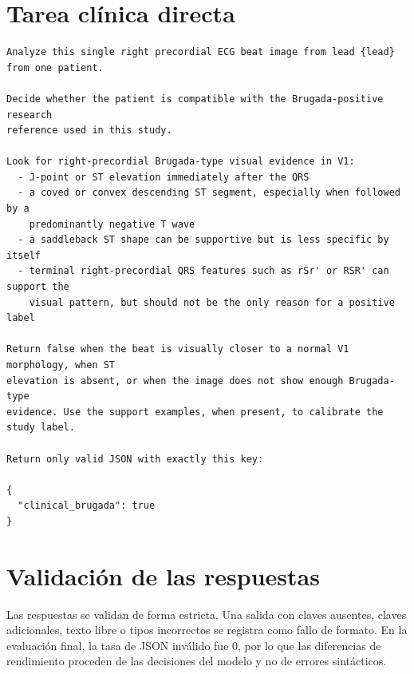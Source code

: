 \section{Tarea cl\'inica directa}

\begin{lstlisting}
Analyze this single right precordial ECG beat image from lead {lead} from one patient.

Decide whether the patient is compatible with the Brugada-positive research
reference used in this study.

Look for right-precordial Brugada-type visual evidence in V1:
  - J-point or ST elevation immediately after the QRS
  - a coved or convex descending ST segment, especially when followed by a
    predominantly negative T wave
  - a saddleback ST shape can be supportive but is less specific by itself
  - terminal right-precordial QRS features such as rSr' or RSR' can support the
    visual pattern, but should not be the only reason for a positive label

Return false when the beat is visually closer to a normal V1 morphology, when ST
elevation is absent, or when the image does not show enough Brugada-type
evidence. Use the support examples, when present, to calibrate the study label.

Return only valid JSON with exactly this key:

{
  "clinical_brugada": true
}
\end{lstlisting}

\section{Validaci\'on de las respuestas}

Las respuestas se validan de forma estricta. Una salida con claves ausentes, claves adicionales, texto libre o tipos incorrectos se registra como fallo de formato. En la evaluaci\'on final, la tasa de JSON inv\'alido fue 0, por lo que las diferencias de rendimiento proceden de las decisiones del modelo y no de errores sint\'acticos.
